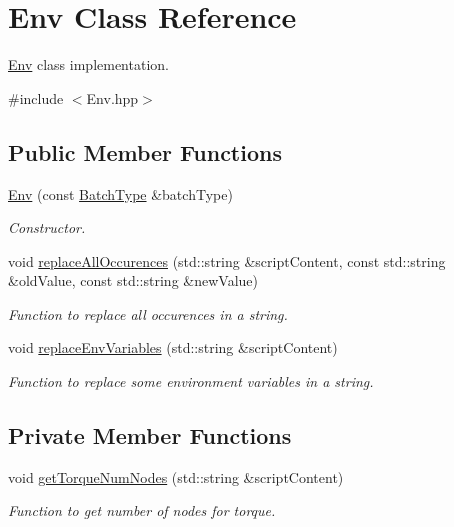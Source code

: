 \hypertarget{classEnv}{
\section{Env Class Reference}
\label{classEnv}
}


\hyperlink{classEnv}{Env} class implementation.  




{\ttfamily \#include $<$Env.hpp$>$}

\subsection*{Public Member Functions}
\begin{DoxyCompactItemize}
\item 
\hyperlink{classEnv_af79a38d660d0c8854858075a529fa8c8}{Env} (const \hyperlink{utilVishnu_8hpp_a864d748e7097d176552dd4c7635016ea}{BatchType} \&batchType)
\begin{DoxyCompactList}\small\item\em Constructor. \item\end{DoxyCompactList}\item 
void \hyperlink{classEnv_ae392272deae068e7f74d0ae26231acb2}{replaceAllOccurences} (std::string \&scriptContent, const std::string \&oldValue, const std::string \&newValue)
\begin{DoxyCompactList}\small\item\em Function to replace all occurences in a string. \item\end{DoxyCompactList}\item 
void \hyperlink{classEnv_abe12e01f5012827ca1a6fb635a613367}{replaceEnvVariables} (std::string \&scriptContent)
\begin{DoxyCompactList}\small\item\em Function to replace some environment variables in a string. \item\end{DoxyCompactList}\end{DoxyCompactItemize}
\subsection*{Private Member Functions}
\begin{DoxyCompactItemize}
\item 
void \hyperlink{classEnv_ac6516808e45dbea3e40383ba8a1525ed}{getTorqueNumNodes} (std::string \&scriptContent)
\begin{DoxyCompactList}\small\item\em Function to get number of nodes for torque. \item\end{DoxyCompactList}\end{DoxyCompactItemize}
